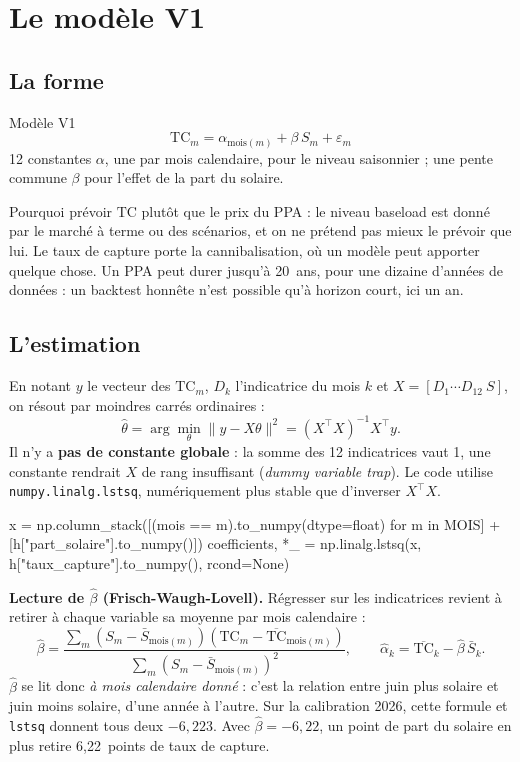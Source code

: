 \documentclass[11pt,a4paper]{article}
\newcommand{\code}[1]{\texttt{\small #1}}
\newcommand{\TC}{\mathrm{TC}}
\begin{document}
\section{Le modèle V1}

\subsection{La forme}

\begin{definition}{Modèle V1}
\[
\TC_m = \alpha_{\text{mois}(m)} + \beta\, S_m + \varepsilon_m
\]
12 constantes $\alpha$, une par mois calendaire, pour le niveau saisonnier ; une pente commune $\beta$ pour l'effet de la part du solaire.
\end{definition}

Pourquoi prévoir $\TC$ plutôt que le prix du PPA : le niveau baseload est donné par le marché à terme ou des scénarios, et on ne prétend pas mieux le prévoir que lui. Le
taux de capture porte la cannibalisation, où un modèle peut apporter quelque chose. Un PPA peut durer jusqu'à 20~ans, pour une dizaine d'années de données : un backtest honnête
n'est possible qu'à horizon court, ici un an.

\subsection{L'estimation}

En notant $y$ le vecteur des $\TC_m$, $D_k$ l'indicatrice du mois $k$ et $X = [D_1 \cdots D_{12}\ S]$, on résout par moindres carrés ordinaires :
\[
\hat\theta = \arg\min_\theta \|y - X\theta\|^2 = (X^\top X)^{-1} X^\top y .
\]
Il n'y a \textbf{pas de constante globale} : la somme des 12 indicatrices vaut 1, une constante rendrait $X$ de rang insuffisant (\emph{dummy variable trap}). Le code utilise
\code{numpy.linalg.lstsq}, numériquement plus stable que d'inverser $X^\top X$.

\begin{codepy}
x = np.column_stack([(mois == m).to_numpy(dtype=float) for m in MOIS] + [h["part_solaire"].to_numpy()])
coefficients, *_ = np.linalg.lstsq(x, h["taux_capture"].to_numpy(), rcond=None)
\end{codepy}

\textbf{Lecture de $\hat\beta$ (Frisch-Waugh-Lovell).} Régresser sur les indicatrices revient à retirer à chaque variable sa moyenne par mois calendaire :
\[
\hat\beta = \frac{\sum_m (S_m - \bar S_{\text{mois}(m)})(\TC_m - \overline{\TC}_{\text{mois}(m)})}{\sum_m (S_m - \bar S_{\text{mois}(m)})^2},
\qquad
\hat\alpha_k = \overline{\TC}_k - \hat\beta\, \bar S_k .
\]
$\hat\beta$ se lit donc \emph{à mois calendaire donné} : c'est la relation entre juin plus solaire et juin moins solaire, d'une année à l'autre. Sur la calibration 2026, cette formule et
\code{lstsq} donnent tous deux $-6{,}223$. Avec $\hat\beta = -6{,}22$, un point de part du solaire en plus retire 6,22~points de taux de capture.
\end{document}
